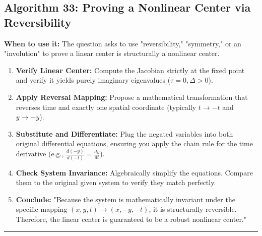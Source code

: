\documentclass[11pt, a4paper]{report}
\begin{document}
\subsection*{Algorithm 33: Proving a Nonlinear Center via Reversibility}
\textbf{When to use it:} The question asks to use "reversibility," "symmetry," or an "involution" to prove a linear center is structurally a nonlinear center.
\begin{enumerate}[label=\textbf{\arabic*.}]
    \item \textbf{Verify Linear Center:} Compute the Jacobian strictly at the fixed point and verify it yields purely imaginary eigenvalues ($\tau = 0, \Delta > 0$).
    \item \textbf{Apply Reversal Mapping:} Propose a mathematical transformation that reverses time and exactly one spatial coordinate (typically $t \to -t$ and $y \to -y$).
    \item \textbf{Substitute and Differentiate:} Plug the negated variables into both original differential equations, ensuring you apply the chain rule for the time derivative (e.g., $\frac{d(-y)}{d(-t)} = \frac{dy}{dt}$).
    \item \textbf{Check System Invariance:} Algebraically simplify the equations. Compare them to the original given system to verify they match perfectly.
    \item \textbf{Conclude:} "Because the system is mathematically invariant under the specific mapping $(x,y,t) \to (x,-y,-t)$, it is structurally reversible. Therefore, the linear center is guaranteed to be a robust nonlinear center."
\end{enumerate}
\vspace{1em}
\noindent\rule{\textwidth}{0.4pt}
\vspace{1em}
\end{document}
